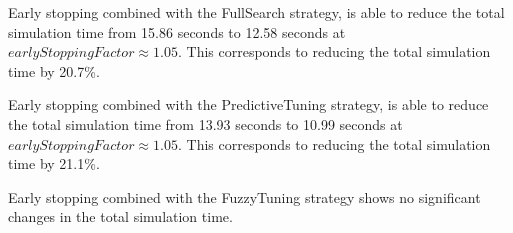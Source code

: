 \documentclass[conference]{IEEEtran}
\begin{document}
\begin{description}[style=nextline]
    \item[FullSearch (\autoref{fig:full_search})]
        Early stopping combined with the FullSearch strategy, is able to reduce the total simulation time from 15.86 seconds to 12.58 seconds at $earlyStoppingFactor \approx1.05$. This corresponds to reducing the total simulation time by 20.7\%.
    \item[PredictiveTuning (\autoref{fig:predictive_tuning})]
        Early stopping combined with the PredictiveTuning strategy, is able to reduce the total simulation time from 13.93 seconds to 10.99 seconds at $earlyStoppingFactor \approx1.05$. This corresponds to reducing the total simulation time by 21.1\%.
    \item[FuzzyTuning (\autoref{fig:fuzzy_tuning})]
        Early stopping combined with the FuzzyTuning strategy shows no significant changes in the total simulation time.
\end{description}
\end{document}
